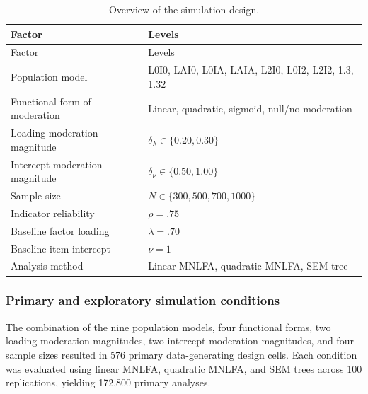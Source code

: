 \documentclass[
  man,
  floatsintext]{apa7}
\begin{document}
\begin{longtable}[]{@{}
  >{\raggedright\arraybackslash}p{}
  >{\raggedright\arraybackslash}p{}@{}}
\caption{Overview of the simulation design.}\tabularnewline
\toprule\noalign{}
\begin{minipage}[b]{\linewidth}\raggedright
Factor
\end{minipage} & \begin{minipage}[b]{\linewidth}\raggedright
Levels
\end{minipage} \\
\midrule\noalign{}
\endfirsthead
\toprule\noalign{}
\begin{minipage}[b]{\linewidth}\raggedright
Factor
\end{minipage} & \begin{minipage}[b]{\linewidth}\raggedright
Levels
\end{minipage} \\
\midrule\noalign{}
\endhead
\bottomrule\noalign{}
\endlastfoot
Population model & L0I0, LAI0, L0IA, LAIA, L2I0, L0I2, L2I2, 1.3,
1.32 \\
Functional form of moderation & Linear, quadratic, sigmoid, null/no
moderation \\
Loading moderation magnitude & \(\delta_\lambda \in \{0.20, 0.30\}\) \\
Intercept moderation magnitude & \(\delta_\nu \in \{0.50, 1.00\}\) \\
Sample size & \(N \in \{300, 500, 700, 1000\}\) \\
Indicator reliability & \(\rho = .75\) \\
Baseline factor loading & \(\lambda = .70\) \\
Baseline item intercept & \(\nu = 1\) \\
Analysis method & Linear MNLFA, quadratic MNLFA, SEM tree \\
\end{longtable}

\subsubsection{Primary and exploratory simulation
conditions}\label{primary-and-exploratory-simulation-conditions}

The combination of the nine population models, four functional forms,
two loading-moderation magnitudes, two intercept-moderation magnitudes,
and four sample sizes resulted in 576 primary data-generating design
cells. Each condition was evaluated using linear MNLFA, quadratic MNLFA,
and SEM trees across 100 replications, yielding 172,800 primary
analyses.
\end{document}
